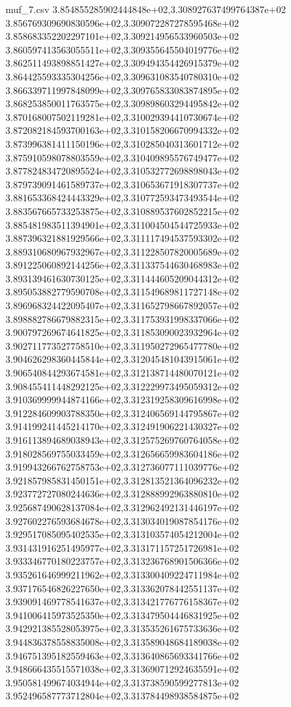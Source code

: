 \begin{filecontents*}{muf_7.csv}
3.854855285902444848e+02,3.308927637499764387e+02
3.856769309690830596e+02,3.309072287278595468e+02
3.858683352202297101e+02,3.309214956533960503e+02
3.860597413563055511e+02,3.309355645504019776e+02
3.862511493898851427e+02,3.309494354426915379e+02
3.864425593335304256e+02,3.309631083540780310e+02
3.866339711997848099e+02,3.309765833083874895e+02
3.868253850011763575e+02,3.309898603294495842e+02
3.870168007502119281e+02,3.310029394410730674e+02
3.872082184593700163e+02,3.310158206670994332e+02
3.873996381411150196e+02,3.310285040313601712e+02
3.875910598078803559e+02,3.310409895576749477e+02
3.877824834720895524e+02,3.310532772698898043e+02
3.879739091461589737e+02,3.310653671918307737e+02
3.881653368424443329e+02,3.310772593473493544e+02
3.883567665733253875e+02,3.310889537602852215e+02
3.885481983511394901e+02,3.311004504544725933e+02
3.887396321881929566e+02,3.311117494537593302e+02
3.889310680967932967e+02,3.311228507820005689e+02
3.891225060892144256e+02,3.311337544630468983e+02
3.893139461630730125e+02,3.311444605209044312e+02
3.895053882779590708e+02,3.311549689811727148e+02
3.896968324422095407e+02,3.311652798667892057e+02
3.898882786679882315e+02,3.311753931998337066e+02
3.900797269674641825e+02,3.311853090023932964e+02
3.902711773527758510e+02,3.311950272965477780e+02
3.904626298360445844e+02,3.312045481043915061e+02
3.906540844293674581e+02,3.312138714480070121e+02
3.908455411448292125e+02,3.312229973495059312e+02
3.910369999944874166e+02,3.312319258309616998e+02
3.912284609903788350e+02,3.312406569144795867e+02
3.914199241445214170e+02,3.312491906221430327e+02
3.916113894689038943e+02,3.312575269760764058e+02
3.918028569755033459e+02,3.312656659983604186e+02
3.919943266762758753e+02,3.312736077111039776e+02
3.921857985831450151e+02,3.312813521364096232e+02
3.923772727080244636e+02,3.312888992963880810e+02
3.925687490628137084e+02,3.312962492131446197e+02
3.927602276593684678e+02,3.313034019087854176e+02
3.929517085095402535e+02,3.313103574054212004e+02
3.931431916251495977e+02,3.313171157251726981e+02
3.933346770180223757e+02,3.313236768901506366e+02
3.935261646999211962e+02,3.313300409224711984e+02
3.937176546826227650e+02,3.313362078442551137e+02
3.939091469778541637e+02,3.313421776776158367e+02
3.941006415973525350e+02,3.313479504446831925e+02
3.942921385528053975e+02,3.313535261675733636e+02
3.944836378558835008e+02,3.313589048684189038e+02
3.946751395182559463e+02,3.313640865693341766e+02
3.948666435515571038e+02,3.313690712924635591e+02
3.950581499674034944e+02,3.313738590599277813e+02
3.952496587773712804e+02,3.313784498938584875e+02

\end{filecontents*}
